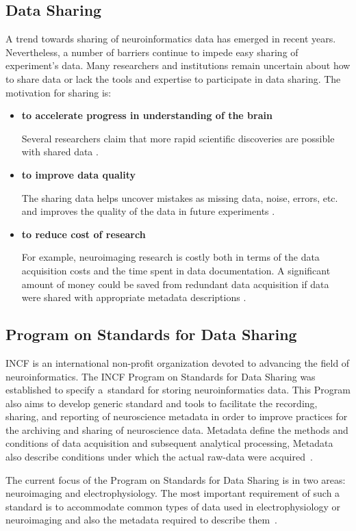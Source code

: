 \documentclass[conference]{IEEEtran}
\begin{document}
\subsection{Data Sharing}
A trend towards sharing of neuroinformatics data has emerged in recent years. Nevertheless, a number of barriers continue to impede easy sharing of experiment's data. Many researchers and institutions remain uncertain about how to share data or lack the tools and expertise to participate in data sharing. The motivation for sharing is:
\begin{itemize}
	\item \textbf{to accelerate progress in understanding of the brain}
	
	
	Several researchers claim that more rapid scientific discoveries are possible with shared data \cite{Milham2012} \cite{Poldrack2012}.
	\item \textbf{to improve data quality}
	
	The sharing data helps uncover mistakes as missing data, noise, errors, etc. and improves the quality of the data in future experiments \cite{Poline2012}.
	\item  \textbf{to reduce cost of research}
	
	For example, neuroimaging research is costly both in terms of the data acquisition costs and the time spent in data documentation. A significant amount of money could be saved from redundant data acquisition if data were shared with appropriate metadata descriptions \cite{Poline2012}.
	\end{itemize}


\subsection{Program on Standards for Data Sharing}
\label{incf}
INCF is an international non-profit organization devoted to advancing the field of neuroinformatics. The INCF Program on Standards for Data Sharing was established to specify a~standard for storing neuroinformatics data. This Program also aims to develop generic standard and tools to facilitate the recording, sharing, and reporting of neuroscience metadata in order to improve practices for the archiving and sharing of neuroscience data. Metadata define the methods and conditions of data acquisition and subsequent analytical processing, Metadata also describe conditions under which the actual raw-data were acquired~\cite{incf_mission}.

The current focus of the Program on Standards for Data Sharing is in two areas: neuroimaging and electrophysiology. The most important requirement of such a standard is to accommodate common types of data used in electrophysiology or neuroimaging and also the metadata required to describe them~\cite{incf_mission}.
\end{document}
